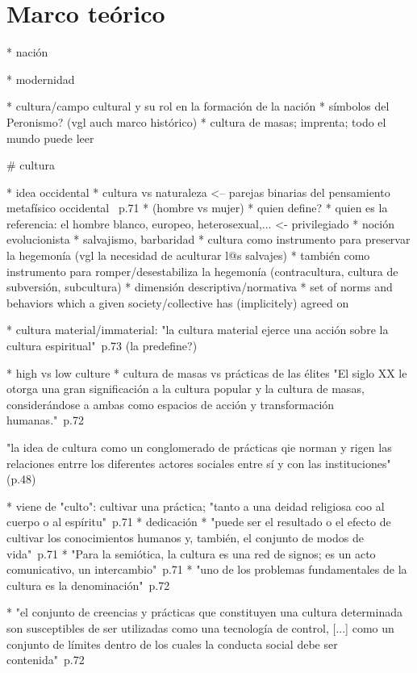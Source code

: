 \section{Marco teórico}

* nación

* modernidad

* cultura/campo cultural y su rol en la formación de la nación
  * símbolos del Peronismo? (vgl auch marco histórico)
  * cultura de masas; imprenta; todo el mundo puede leer


# cultura

* idea occidental
* cultura vs naturaleza <-- parejas binarias del pensamiento metafísico occidental ~\cite{SzIr2009}{p.71}
* (hombre vs mujer)
* quien define?
* quien es la referencia: el hombre blanco, europeo, heterosexual,... <- privilegiado
* noción evolucionista
* salvajismo, barbaridad
* cultura como instrumento para preservar la hegemonía (vgl la necesidad de aculturar l@s salvajes)
* también como instrumento para romper/desestabiliza la hegemonía (contracultura, cultura de subversión, subcultura)
* dimensión descriptiva/normativa
* set of norms and behaviors which a given society/collective has (implicitely) agreed on

* cultura material/immaterial: "la cultura material ejerce una acción sobre la cultura espiritual"~\cite{SzIr}{p.73} (la predefine?)

* high vs low culture
* cultura de masas vs prácticas de las élites
"El siglo XX le otorga una gran significación a la cultura popular y la cultura de masas, considerándose a ambas como espacios de acción y transformación humanas."~\cite{SzIr2009}{p.72}

"la idea de cultura como un conglomerado de prácticas qie norman y rigen las relaciones entrre los diferentes actores sociales entre sí y con las instituciones" (p.48) ~\cite{SzIr2009}

* viene de "culto": cultivar una práctica; "tanto a una deidad religiosa coo al cuerpo o al espíritu"~\cite{SzIr2009}{p.71}
* dedicación
* "puede ser el resultado o el efecto de cultivar los conocimientos humanos y, también, el conjunto de modos de vida"~\cite{SzIr2009}{p.71}
* "Para la semiótica, la cultura es una red de signos; es un acto comunicativo, un intercambio"~\cite{SzIr2009}{p.71}
* "uno de los problemas fundamentales de la cultura es la denominación"~\cite{SzIr2009}{p.72}

* "el conjunto de creencias y prácticas que constituyen una cultura determinada son susceptibles de ser utilizadas como una tecnología de control, [...] como un conjunto de límites dentro de los cuales la conducta social debe ser contenida"~\cite{IzIr2009}{p.72}

